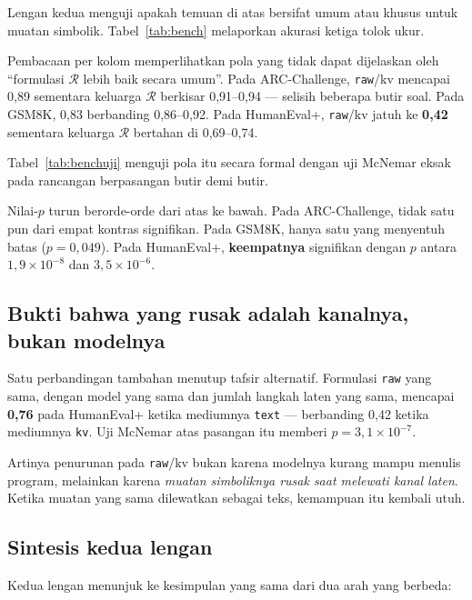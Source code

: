 \documentclass{laporanta1statugm}
\newcommand{\code}[1]{\texttt{#1}}
\begin{document}
Lengan kedua menguji apakah temuan di atas bersifat umum atau khusus untuk
muatan simbolik. Tabel~\ref{tab:bench} melaporkan akurasi ketiga tolok ukur.



Pembacaan per kolom memperlihatkan pola yang tidak dapat dijelaskan oleh
``formulasi $\mathcal{R}$ lebih baik secara umum''. Pada ARC-Challenge,
\code{raw}/kv mencapai 0,89 sementara keluarga $\mathcal{R}$ berkisar
0,91--0,94 --- selisih beberapa butir soal. Pada GSM8K, 0,83 berbanding
0,86--0,92. Pada HumanEval+, \code{raw}/kv jatuh ke \textbf{0,42} sementara
keluarga $\mathcal{R}$ bertahan di 0,69--0,74.

Tabel~\ref{tab:benchuji} menguji pola itu secara formal dengan uji McNemar
eksak pada rancangan berpasangan butir demi butir.



Nilai-$p$ turun berorde-orde dari atas ke bawah. Pada ARC-Challenge, tidak
satu pun dari empat kontras signifikan. Pada GSM8K, hanya satu yang menyentuh
batas ($p = 0{,}049$). Pada HumanEval+, \textbf{keempatnya} signifikan dengan
$p$ antara $1{,}9\times10^{-8}$ dan $3{,}5\times10^{-6}$.

\subsection{Bukti bahwa yang rusak adalah kanalnya, bukan modelnya}

Satu perbandingan tambahan menutup tafsir alternatif. Formulasi \code{raw} yang
sama, dengan model yang sama dan jumlah langkah laten yang sama, mencapai
\textbf{0,76} pada HumanEval+ ketika mediumnya \code{text} --- berbanding 0,42
ketika mediumnya \code{kv}. Uji McNemar atas pasangan itu memberi
$p = 3{,}1\times10^{-7}$.

Artinya penurunan pada \code{raw}/kv bukan karena modelnya kurang mampu
menulis program, melainkan karena \emph{muatan simboliknya rusak saat melewati
kanal laten}. Ketika muatan yang sama dilewatkan sebagai teks, kemampuan itu
kembali utuh.

\subsection{Sintesis kedua lengan}

Kedua lengan menunjuk ke kesimpulan yang sama dari dua arah yang berbeda:
\end{document}
